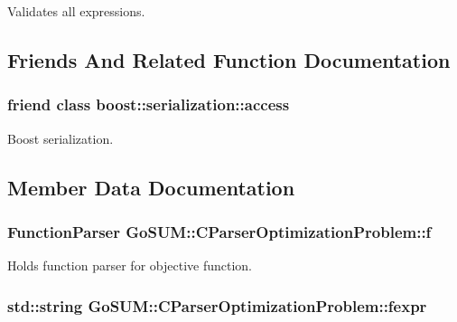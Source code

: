 Validates all expressions. 



\subsection{Friends And Related Function Documentation}
\hypertarget{class_go_s_u_m_1_1_c_parser_optimization_problem_ac98d07dd8f7b70e16ccb9a01abf56b9c}{
\subsubsection[{boost\-::serialization\-::access}]{\setlength{\rightskip}{0pt plus 5cm}friend class boost\-::serialization\-::access\hspace{0.3cm}{\ttfamily [friend]}}}\label{class_go_s_u_m_1_1_c_parser_optimization_problem_ac98d07dd8f7b70e16ccb9a01abf56b9c}


Boost serialization. 



\subsection{Member Data Documentation}
\hypertarget{class_go_s_u_m_1_1_c_parser_optimization_problem_a0c6b06efec51542bc99e397b7d15afa0}{
\subsubsection[{f}]{\setlength{\rightskip}{0pt plus 5cm}Function\-Parser Go\-S\-U\-M\-::\-C\-Parser\-Optimization\-Problem\-::f\hspace{0.3cm}{\ttfamily [protected]}}}\label{class_go_s_u_m_1_1_c_parser_optimization_problem_a0c6b06efec51542bc99e397b7d15afa0}


Holds function parser for objective function. 

\hypertarget{class_go_s_u_m_1_1_c_parser_optimization_problem_a0e5ca56845f6f3b1fc0822ded4d8ff28}{
\subsubsection[{fexpr}]{\setlength{\rightskip}{0pt plus 5cm}std\-::string Go\-S\-U\-M\-::\-C\-Parser\-Optimization\-Problem\-::fexpr\hspace{0.3cm}{\ttfamily [protected]}}}\label{class_go_s_u_m_1_1_c_parser_optimization_problem_a0e5ca56845f6f3b1fc0822ded4d8ff28}


